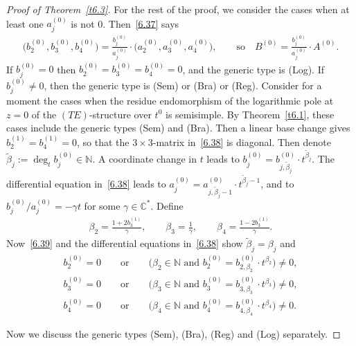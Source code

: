 \documentclass[10pt,a4paper]{amsart}
\numberwithin{equation}{section}
\numberwithin{figure}{section}
\newcommand{\N}{{\mathbb N}}
\newcommand{\C}{{\mathbb C}}
\newcommand{\www}{\widetilde}
\begin{document}
\begin{proof}[Proof of Theorem~\ref{t6.3}]
For the rest of the proof, we consider the cases
when at least one $a_j^{(0)}$ is not 0.
Then~\eqref{6.37} says
\begin{gather}\label{6.39}
\big(b_2^{(0)},b_3^{(0)},b_4^{(0)}\big)=\frac{b_j^{(0)}}{a_j^{(0)}}
\cdot \big(a_2^{(0)},a_3^{(0)},a_4^{(0)}\big),\qquad
\text{so} \quad B^{(0)} = \frac{b_j^{(0)}}{a_j^{(0)}}\cdot A^{(0)}.
\end{gather}
If $b_j^{(0)}=0$ then $b_2^{(0)}=b_3^{(0)}=b_4^{(0)}=0$,
and the generic type is (Log).
If $b_j^{(0)}\neq 0$, then the generic type is
(Sem) or (Bra) or (Reg).
Consider for a moment the cases when the residue endomorphism
of the logarithmic pole at $z=0$ of the $(TE)$-structure
over $t^0$ is semisimple. By Theorem~\ref{t6.1}, these cases
include the generic types (Sem) and (Bra).
Then a linear base change gives $b_2^{(1)}=b_4^{(1)}=0$,
so that the $3\times 3$-matrix in~\eqref{6.38} is diagonal.
Then denote $\www\beta_j:=\deg_t b_j^{(0)}\in\N$.
A coordinate change in $t$ leads to
$b_j^{(0)}=b_{j,\www\beta_j}^{(0)}\cdot t^{\www\beta_j}$.
The differential equation in~\eqref{6.38} leads to
$a_j^{(0)}=a_{j,\www\beta_j-1}^{(0)}\cdot t^{\www\beta_j-1}$,
and to $b_j^{(0)}/a_j^{(0)}=-\gamma t$ for some $\gamma\in\C^*$.
Define
\begin{gather}\label{6.40}
\beta_2=\frac{1+2b_3^{(1)}}{\gamma},\qquad
\beta_3=\frac{1}{\gamma},\qquad
\beta_4=\frac{1-2b_3^{(1)}}{\gamma}.
\end{gather}
Now~\eqref{6.39} and the differential equations in~\eqref{6.38}
show $\www\beta_j=\beta_j$ and
\begin{gather}
b_2^{(0)}=0\qquad\text{or}\qquad\big(\beta_2\in\N\text{ and }
b_2^{(0)}=b_{2,\beta_2}^{(0)}\cdot t^{\beta_2}\big)\neq 0,
\nonumber
\\
b_3^{(0)}=0\qquad\text{or}\qquad\big(\beta_3\in\N\text{ and }
b_3^{(0)}=b_{3,\beta_3}^{(0)}\cdot t^{\beta_3}\big)\neq 0,
\label{6.41}
\\
b_4^{(0)}=0\qquad\text{or}\qquad\big(\beta_4\in\N\text{ and }
b_4^{(0)}=b_{4,\beta_4}^{(0)}\cdot t^{\beta_4}\big)\neq 0.
\nonumber
\end{gather}

Now we discuss the generic types (Sem), (Bra), (Reg)
and (Log) separately.


\end{proof}
\end{document}
